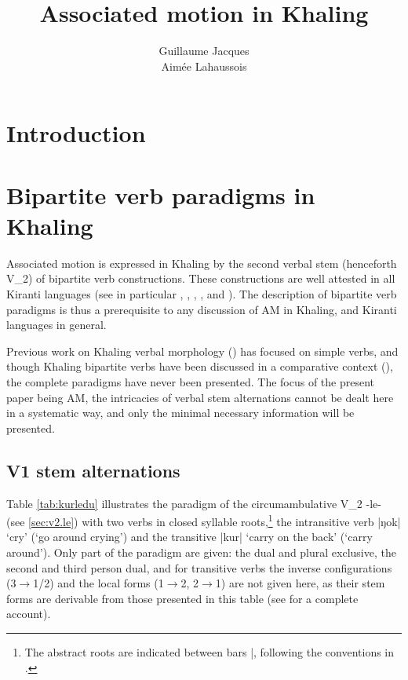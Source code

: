 \documentclass[oneside,a4paper,11pt]{article}
\newcommand{\ipa}[1]{{\phon#1}}
\newcommand{\dhatu}[2]{|\ipa{#1}| `#2'}
\begin{document}
\title{Associated motion in Khaling } 
\author{Guillaume Jacques\\Aimée Lahaussois}
\maketitle
\linenumbers
\section{Introduction}
\section{Bipartite verb paradigms in Khaling}
Associated motion is expressed in Khaling by the second verbal stem (henceforth V_2) of bipartite verb constructions. These constructions are well attested in all Kiranti languages (see in particular \citealt[118-132]{driem87}, \citealt[199-214]{driem93dumi},  \citealt[137-194]{rutgers98yamphu}, \citealt{bickel07chintang}, \citealt[170-172]{doornenbal09} and \citealt[283-328]{schackow15yakkha}). The description of bipartite verb paradigms is thus a prerequisite to any discussion of AM in Khaling, and Kiranti languages in general.

Previous work on Khaling verbal morphology (\citealt{jacques12khaling, jacques16si}) has focused on simple verbs, and though Khaling bipartite verbs have been discussed in a comparative context (\citealt{jacques18bipartite}), the complete paradigms have never been presented. The focus of the present paper being AM, the intricacies of verbal stem alternations cannot be dealt here in a systematic way, and only the minimal necessary information will be presented.

\subsection{V1 stem alternations}

Table \ref{tab:kurledu} illustrates the paradigm of the circumambulative V_2 \ipa{-le-} (see \ref{sec:v2.le}) with two verbs in closed syllable roots,\footnote{The abstract roots are indicated between bars |, following the conventions in \citet{jacques12khaling}.} the intransitive verb \dhatu{ŋok}{cry} (`go around crying') and the transitive \dhatu{kur}{carry on the back} (`carry around'). Only part of the paradigm are given: the dual and plural exclusive, the second and third person dual,  and for transitive verbs the inverse configurations (3$\rightarrow$1/2) and the local forms (1$\rightarrow$2, 2$\rightarrow$1) are not given here, as their stem forms are derivable from those presented in this table (see \citealt{jacques12khaling} for a complete account).
\end{document}
